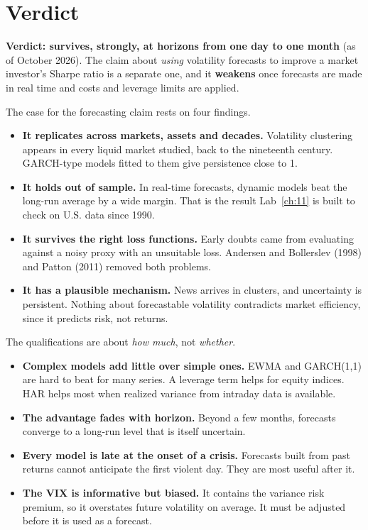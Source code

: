 \section{Verdict}
\label{sec:11-verdict}

\begin{callout}
\textbf{Verdict: survives, strongly, at horizons from one day to one month} (as of October 2026). The claim about \emph{using} volatility forecasts to improve a market investor's Sharpe ratio is a separate one, and it \textbf{weakens} once forecasts are made in real time and costs and leverage limits are applied.
\end{callout}

The case for the forecasting claim rests on four findings.

\begin{itemize}
  \item \textbf{It replicates across markets, assets and decades.} Volatility clustering appears in every liquid market studied, back to the nineteenth century. GARCH-type models fitted to them give persistence close to 1.
  \item \textbf{It holds out of sample.} In real-time forecasts, dynamic models beat the long-run average by a wide margin. That is the result Lab~\ref{ch:11} is built to check on U.S. data since 1990.
  \item \textbf{It survives the right loss functions.} Early doubts came from evaluating against a noisy proxy with an unsuitable loss. Andersen and Bollerslev (1998) and Patton (2011) removed both problems.
  \item \textbf{It has a plausible mechanism.} News arrives in clusters, and uncertainty is persistent. Nothing about forecastable volatility contradicts market efficiency, since it predicts risk, not returns.
\end{itemize}

The qualifications are about \emph{how much}, not \emph{whether}.

\begin{itemize}
  \item \textbf{Complex models add little over simple ones.} EWMA and GARCH(1,1) are hard to beat for many series. A leverage term helps for equity indices. HAR helps most when realized variance from intraday data is available.
  \item \textbf{The advantage fades with horizon.} Beyond a few months, forecasts converge to a long-run level that is itself uncertain.
  \item \textbf{Every model is late at the onset of a crisis.} Forecasts built from past returns cannot anticipate the first violent day. They are most useful after it.
  \item \textbf{The VIX is informative but biased.} It contains the variance risk premium, so it overstates future volatility on average. It must be adjusted before it is used as a forecast.
\end{itemize}

